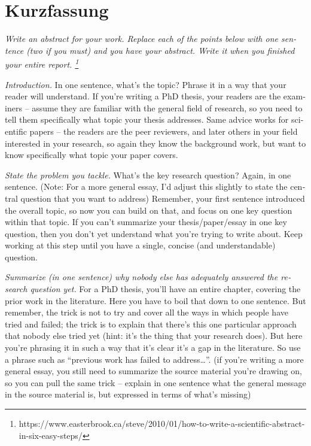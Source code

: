 \section*{Kurzfassung}
\begin{otherlanguage}{american}
  \emph{Write an abstract for your work.
    Replace each of the points below with one sentence (two if you must) and you have your abstract.
    Write it when you finished your entire report.
    \footnote{https://www.easterbrook.ca/steve/2010/01/how-to-write-a-scientific-abstract-in-six-easy-steps/}}

  \emph{Introduction.}
  In one sentence, what’s the topic?
  Phrase it in a way that your reader will understand.
  If you’re writing a PhD thesis, your readers are the examiners – assume they are familiar with the general field of research, so you need to tell them specifically what topic your thesis addresses.
  Same advice works for scientific papers – the readers are the peer reviewers, and later others in your field interested in your research, so again they know the background work, but want to know specifically what topic your paper covers.

  \emph{State the problem you tackle.}
  What’s the key research question?
  Again, in one sentence.
  (Note: For a more general essay, I’d adjust this slightly to state the central question that you want to address)
  Remember, your first sentence introduced the overall topic, so now you can build on that, and focus on one key question within that topic.
  If you can’t summarize your thesis/paper/essay in one key question, then you don’t yet understand what you’re trying to write about.
  Keep working at this step until you have a single, concise (and understandable) question.

  \emph{Summarize (in one sentence) why nobody else has adequately answered the research question yet.}
  For a PhD thesis, you’ll have an entire chapter, covering the prior work in the literature.
  Here you have to boil that down to one sentence.
  But remember, the trick is not to try and cover all the ways in which people have tried and failed; the trick is to explain that there’s this one particular approach that nobody else tried yet (hint: it’s the thing that your research does).
  But here you’re phrasing it in such a way that it’s clear it’s a gap in the literature.
  So use a phrase such as “previous work has failed to address…”.
  (if you’re writing a more general essay, you still need to summarize the source material you’re drawing on, so you can pull the same trick – explain in one sentence what the general message in the source material is, but expressed in terms of what’s missing)


\end{otherlanguage}
